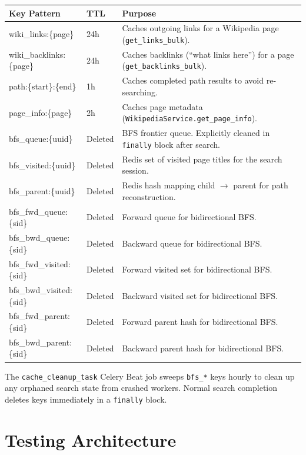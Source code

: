 \documentclass[11pt,a4paper]{article}
\begin{document}
\begin{tabularx}{\textwidth}{@{}>{\ttfamily}l l X@{}}
\toprule
\normalfont\textbf{Key Pattern} & \textbf{TTL} & \textbf{Purpose} \\
\midrule
wiki\_links:\{page\} & 24h & Caches outgoing links for a Wikipedia page (\texttt{get\_links\_bulk}). \\
wiki\_backlinks:\{page\} & 24h & Caches backlinks (``what links here'') for a page (\texttt{get\_backlinks\_bulk}). \\
path:\{start\}:\{end\} & 1h & Caches completed path results to avoid re-searching. \\
page\_info:\{page\} & 2h & Caches page metadata (\texttt{WikipediaService.get\_page\_info}). \\
bfs\_queue:\{uuid\} & Deleted & BFS frontier queue. Explicitly cleaned in \texttt{finally} block after search. \\
bfs\_visited:\{uuid\} & Deleted & Redis set of visited page titles for the search session. \\
bfs\_parent:\{uuid\} & Deleted & Redis hash mapping child $\rightarrow$ parent for path reconstruction. \\
bfs\_fwd\_queue:\{sid\} & Deleted & Forward queue for bidirectional BFS. \\
bfs\_bwd\_queue:\{sid\} & Deleted & Backward queue for bidirectional BFS. \\
bfs\_fwd\_visited:\{sid\} & Deleted & Forward visited set for bidirectional BFS. \\
bfs\_bwd\_visited:\{sid\} & Deleted & Backward visited set for bidirectional BFS. \\
bfs\_fwd\_parent:\{sid\} & Deleted & Forward parent hash for bidirectional BFS. \\
bfs\_bwd\_parent:\{sid\} & Deleted & Backward parent hash for bidirectional BFS. \\
\bottomrule
\end{tabularx}

\begin{notebox}
The \texttt{cache\_cleanup\_task} Celery Beat job sweeps \texttt{bfs\_*} keys hourly to clean up any orphaned search state from crashed workers. Normal search completion deletes keys immediately in a \texttt{finally} block.
\end{notebox}

\section{Testing Architecture}
\end{document}
